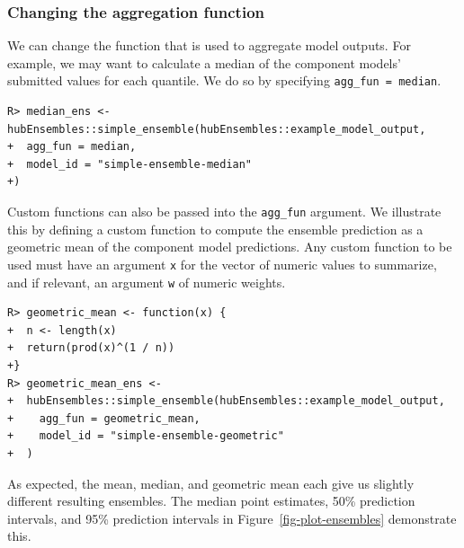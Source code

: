 \documentclass[
  article,
  shortnames,
  notitle]{jss}
\begin{document}
\begin{longtable}[]
\caption{\label{tbl-mean-ensemble}Mean ensemble model output. The values
in the model\_id column are determined by
\texttt{simple\_ensemble(...,\ model\_id\ =\ )} argument). A subset of
ensemble model output is shown: 1-week ahead pmf forecasts made on
2022-12-17 for the US. Results are generated for all output types. Here,
we show only the median, 50\% prediction intervals, and 95\% prediction
intervals for the quantile output type and all bins for the pmf output
type. The \texttt{location} and \texttt{target\_end\_date} columns have
been omitted for brevity, and the \texttt{value} column is rounded to
two digits.}

\tabularnewline
\end{longtable}

\subsubsection{Changing the aggregation
function}\label{changing-the-aggregation-function}

We can change the function that is used to aggregate model outputs. For
example, we may want to calculate a median of the component models'
submitted values for each quantile. We do so by specifying
\texttt{agg\_fun\ =\ median}.

\begin{verbatim}
R> median_ens <- hubEnsembles::simple_ensemble(hubEnsembles::example_model_output,
+  agg_fun = median,
+  model_id = "simple-ensemble-median"
+)
\end{verbatim}

Custom functions can also be passed into the \texttt{agg\_fun} argument.
We illustrate this by defining a custom function to compute the ensemble
prediction as a geometric mean of the component model predictions. Any
custom function to be used must have an argument \texttt{x} for the
vector of numeric values to summarize, and if relevant, an argument
\texttt{w} of numeric weights.

\begin{verbatim}
R> geometric_mean <- function(x) {
+  n <- length(x)
+  return(prod(x)^(1 / n))
+}
R> geometric_mean_ens <-
+  hubEnsembles::simple_ensemble(hubEnsembles::example_model_output,
+    agg_fun = geometric_mean,
+    model_id = "simple-ensemble-geometric"
+  )
\end{verbatim}

As expected, the mean, median, and geometric mean each give us slightly
different resulting ensembles. The median point estimates, 50\%
prediction intervals, and 95\% prediction intervals in
Figure~\ref{fig-plot-ensembles} demonstrate this.
\end{document}
